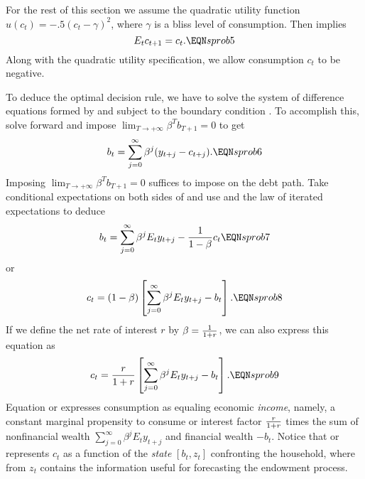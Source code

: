   For the rest of this section we assume
the quadratic  utility function
$u(c_t) =  -.5 (c_t - \gamma)^2$,
where $\gamma$ is a bliss level of consumption. Then
 implies
%
$$ E_t c_{t+1} = c_t . \EQN sprob5 $$
Along  with the quadratic utility specification, we allow consumption
$c_t$ to be negative.


 To deduce the optimal decision rule, we have to solve the system
of difference equations formed by  and  
subject to the boundary condition .   To accomplish this,
solve  forward and impose $\lim_{T\rightarrow +\infty} \beta^T b_{T+1} =0$ to get
$$ b_t = \sum_{j=0}^\infty \beta^j (y_{t+j} - c_{t+j}) .  \EQN sprob6 $$
Imposing $\lim_{T\rightarrow +\infty} \beta^T b_{T+1} =0$ suffices to impose  on the debt
path.
Take conditional expectations on both sides of  and use 
and the law of iterated expectations to deduce
$$ b_t = \sum_{j=0}^\infty \beta^j E_t y_{t+j} - {1 \over 1-\beta} c_t
\EQN sprob7 $$
 or
$$ c_t = (1-\beta)
\left[ \sum_{j=0}^\infty \beta^j E_t y_{t+j} - b_t\right].
 \EQN sprob8  $$
If we define the net rate of interest $r$ by $\beta ={1 \over 1+r}$, we can
also express this
equation as
$$ c_t = {r \over 1+r}
\left[ \sum_{j=0}^\infty \beta^j E_t y_{t+j} - b_t\right]. \EQN sprob9 $$
Equation  or  expresses consumption as equaling
economic {\it income\/}, namely,  a constant
marginal propensity to consume or interest factor ${r \over 1+r}$ times
the sum of nonfinancial wealth $
\sum_{j=0}^\infty \beta^j E_t y_{t+j}$ and financial
wealth $-b_t$.   Notice that  or  represents
$c_t$  as a function of the {\it state\/} $[b_t, z_t]$
 confronting the household, where  from  $z_t$ contains the
information useful for forecasting the endowment process.



